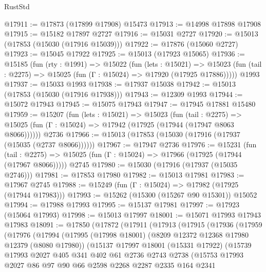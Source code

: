 \begin{lexlean}{RustStd}
\begin{coremodule}
@17911 := @17873 (@17899 @17908) @15473
@17913 := @14998 @17898 @17908
@17915 := @15182 @17897 @2727
@17916 := @15031 @2727
@17920 := @15013 (@17853 (@15030 (@17916 @15039)))
@17922 := @17876 (@15060 @2727)
@17923 := @15045 @17922
@17925 := @15013 (@17923 @15065)
@17936 := @15185
    (fun (rty : @1991) =>
    @15022
      (fun (lets : @15021) =>
      @15023 (fun (tail : @2275) => @15025 (fun (Γ : @15024) => @17920 (@17925 @17886)))))
    @1993
@17937 := @15033 @1993
@17938 := @17937 @15038
@17942 := @15013 (@17853 (@15030 (@17916 @17938)))
@17943 := @12309 @1993
@17944 := @15072 @17943
@17945 := @15075 @17943
@17947 := @17945 @17881 @15480
@17959 := @15207
    (fun (lets : @15021) =>
    @15023
      (fun (tail : @2275) =>
      @15025 (fun (Γ : @15024) => @17942 (@17925 (@17944 (@17947 @8063 @8066))))))
    @2736
@17966 := @15013 (@17853 (@15030 (@17916 (@17937 (@15035 (@2737 @8066))))))
@17967 := @17947 @2736
@17976 := @15231
    (fun (tail : @2275) => @15025 (fun (Γ : @15024) => @17966 (@17925 (@17944 (@17967 @8066)))))
    @2745
@17980 := @15030 (@17916 (@17937 (@15035 @2746)))
@17981 := @17853 @17980
@17982 := @15013 @17981
@17983 := @17967 @2745
@17988 := @15249 (fun (Γ : @15024) => @17982 (@17925 (@17944 @17983)))
@17993 := @15262 (@15300 (@15267 @90 @15301)) @15052
@17994 := @17988 @17993
@17995 := @15137 @17981
@17997 := @17923 (@15064 @17993)
@17998 := @15013 @17997
@18001 := @15071 @17993 @17943 @17983
@18091 := @17850
    (@17872
      (@17911
        (@17913
          (@17915
            (@17936
              (@17959
                (@17976
                  (@17994
                    (@17995
                      (@17998 @18001)
                      (@8209 @12372 @12368 @17980 @12379 (@8080 @17980))
                      (@15137
                        @17997
                        @18001
                        (@15331 @17922)
                        (@15739
                          @17993
                          @2027
                          @405
                          @341
                          @402
                          @61
                          @2736
                          @2743
                          @2738
                          (@15753
                            @17993
                            @2027
                            @86
                            @97
                            @90
                            @66
                            @2598
                            @2268
                            @2287
                            @2335
                            @164
                            @2341

\end{coremodule}
\end{lexlean}
